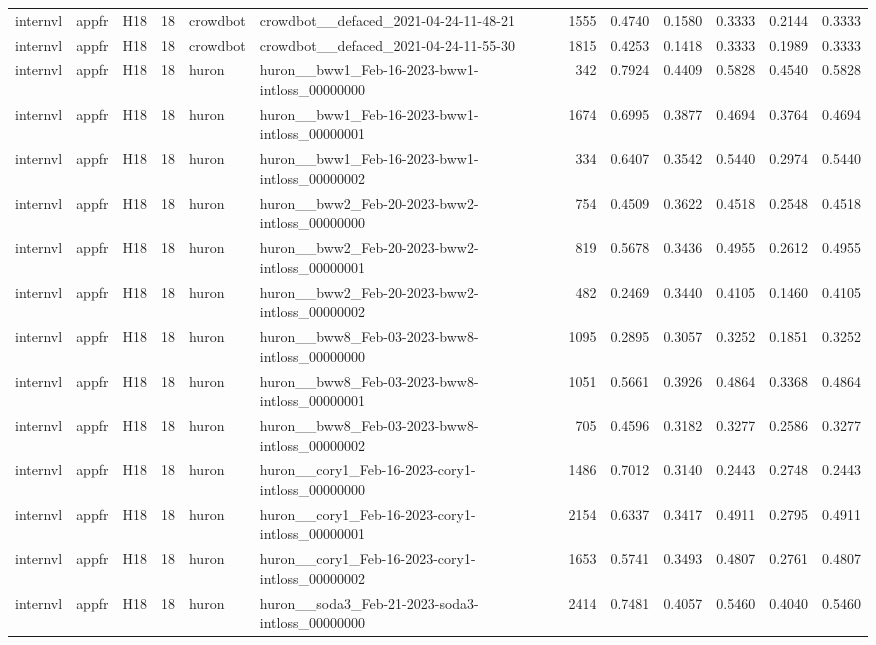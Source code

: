 \begin{table}[tbp]
\begin{tabular}{lllrllrrrrrr}
internvl & appfr & H18 & 18 & crowdbot & crowdbot\_\_defaced\_2021-04-24-11-48-21 & 1555 & 0.4740 & 0.1580 & 0.3333 & 0.2144 & 0.3333 \\
internvl & appfr & H18 & 18 & crowdbot & crowdbot\_\_defaced\_2021-04-24-11-55-30 & 1815 & 0.4253 & 0.1418 & 0.3333 & 0.1989 & 0.3333 \\
internvl & appfr & H18 & 18 & huron & huron\_\_bww1\_Feb-16-2023-bww1-intloss\_00000000 & 342 & 0.7924 & 0.4409 & 0.5828 & 0.4540 & 0.5828 \\
internvl & appfr & H18 & 18 & huron & huron\_\_bww1\_Feb-16-2023-bww1-intloss\_00000001 & 1674 & 0.6995 & 0.3877 & 0.4694 & 0.3764 & 0.4694 \\
internvl & appfr & H18 & 18 & huron & huron\_\_bww1\_Feb-16-2023-bww1-intloss\_00000002 & 334 & 0.6407 & 0.3542 & 0.5440 & 0.2974 & 0.5440 \\
internvl & appfr & H18 & 18 & huron & huron\_\_bww2\_Feb-20-2023-bww2-intloss\_00000000 & 754 & 0.4509 & 0.3622 & 0.4518 & 0.2548 & 0.4518 \\
internvl & appfr & H18 & 18 & huron & huron\_\_bww2\_Feb-20-2023-bww2-intloss\_00000001 & 819 & 0.5678 & 0.3436 & 0.4955 & 0.2612 & 0.4955 \\
internvl & appfr & H18 & 18 & huron & huron\_\_bww2\_Feb-20-2023-bww2-intloss\_00000002 & 482 & 0.2469 & 0.3440 & 0.4105 & 0.1460 & 0.4105 \\
internvl & appfr & H18 & 18 & huron & huron\_\_bww8\_Feb-03-2023-bww8-intloss\_00000000 & 1095 & 0.2895 & 0.3057 & 0.3252 & 0.1851 & 0.3252 \\
internvl & appfr & H18 & 18 & huron & huron\_\_bww8\_Feb-03-2023-bww8-intloss\_00000001 & 1051 & 0.5661 & 0.3926 & 0.4864 & 0.3368 & 0.4864 \\
internvl & appfr & H18 & 18 & huron & huron\_\_bww8\_Feb-03-2023-bww8-intloss\_00000002 & 705 & 0.4596 & 0.3182 & 0.3277 & 0.2586 & 0.3277 \\
internvl & appfr & H18 & 18 & huron & huron\_\_cory1\_Feb-16-2023-cory1-intloss\_00000000 & 1486 & 0.7012 & 0.3140 & 0.2443 & 0.2748 & 0.2443 \\
internvl & appfr & H18 & 18 & huron & huron\_\_cory1\_Feb-16-2023-cory1-intloss\_00000001 & 2154 & 0.6337 & 0.3417 & 0.4911 & 0.2795 & 0.4911 \\
internvl & appfr & H18 & 18 & huron & huron\_\_cory1\_Feb-16-2023-cory1-intloss\_00000002 & 1653 & 0.5741 & 0.3493 & 0.4807 & 0.2761 & 0.4807 \\
internvl & appfr & H18 & 18 & huron & huron\_\_soda3\_Feb-21-2023-soda3-intloss\_00000000 & 2414 & 0.7481 & 0.4057 & 0.5460 & 0.4040 & 0.5460 \\

\end{tabular}
\end{table}
